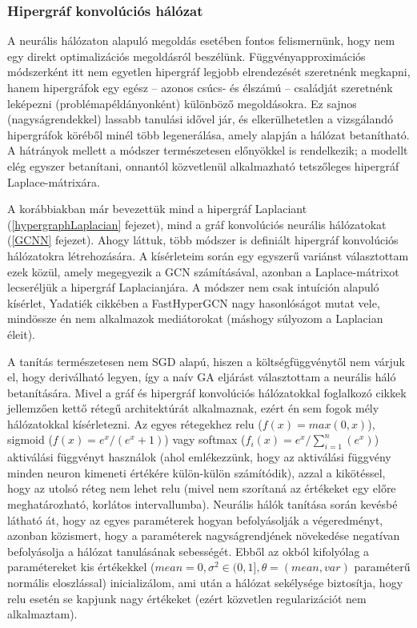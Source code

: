 \subsubsection{Hipergráf konvolúciós hálózat}

A neurális hálózaton alapuló megoldás esetében fontos felismernünk, hogy nem egy direkt optimalizációs megoldásról beszélünk. Függvényapproximációs módszerként itt nem egyetlen hipergráf legjobb elrendezését szeretnénk megkapni, hanem hipergráfok egy egész -- azonos csúcs- és élszámú -- családját szeretnénk leképezni (problémapéldányonként) különböző megoldásokra. Ez  sajnos (nagyságrendekkel) lassabb tanulási idővel jár, és elkerülhetetlen a vizsgálandó hipergráfok köréből minél több legenerálása, amely alapján a hálózat betanítható. A hátrányok mellett a módszer természetesen előnyökkel is rendelkezik; a modellt elég egyszer betanítani, onnantól közvetlenül alkalmazható tetszőleges hipergráf Laplace-mátrixára.


A korábbiakban már bevezettük mind a hipergráf Laplaciant (\ref{hypergraphLaplacian} fejezet), mind a gráf konvolúciós neurális hálózatokat (\ref{GCNN} fejezet). Ahogy láttuk, több módszer is definiált hipergráf konvolúciós hálózatokra létrehozására. A kísérleteim során egy egyszerű variánst választottam ezek közül, amely megegyezik a GCN számításával, azonban a Laplace-mátrixot lecseréljük a hipergráf Laplacianjára. A módszer nem csak intuíción alapuló kísérlet, Yadatiék cikkében\cite{hgcn} a FastHyperGCN nagy hasonlóságot mutat vele, mindössze én nem alkalmazok mediátorokat (máshogy súlyozom a Laplacian éleit).


A tanítás természetesen nem SGD alapú, hiszen a költségfüggvénytől nem várjuk el, hogy deriválható legyen, így a naív GA eljárást választottam a neurális háló betanítására. Mivel a gráf és hipergráf konvolúciós hálózatokkal foglalkozó cikkek jellemzően kettő rétegű architektúrát alkalmaznak\cite{base_gcnn, hgcn}, ezért én sem fogok mély hálózatokkal kísérletezni. Az egyes rétegekhez relu ($f(x)=max(0,x)$), sigmoid ($f(x)=e^x/(e^x+1)$) vagy softmax ($f_i(x)=e^x/\sum_{i=1}^{n}(e^x)$) aktiválási függvényt használok (ahol emlékezzünk, hogy az aktiválási függvény minden neuron kimeneti értékére külön-külön számítódik), azzal a kikötéssel, hogy az utolsó réteg nem lehet relu (mivel nem szorítaná az értékeket egy előre meghatározható, korlátos intervallumba). Neurális hálók tanítása során kevésbé látható át, hogy az egyes paraméterek hogyan befolyásolják a végeredményt, azonban közismert, hogy a paraméterek nagyságrendjének növekedése negatívan befolyásolja a hálózat tanulásának sebességét\cite{nn_regularization}. Ebből az okból kifolyólag a paramétereket kis értékekkel ($mean=0,\sigma^2\in(0,1], \theta = (mean,var)$ paraméterű normális eloszlással) inicializálom, ami után a hálózat sekélysége biztosítja, hogy relu esetén se kapjunk nagy értékeket (ezért közvetlen regularizációt nem alkalmaztam).

